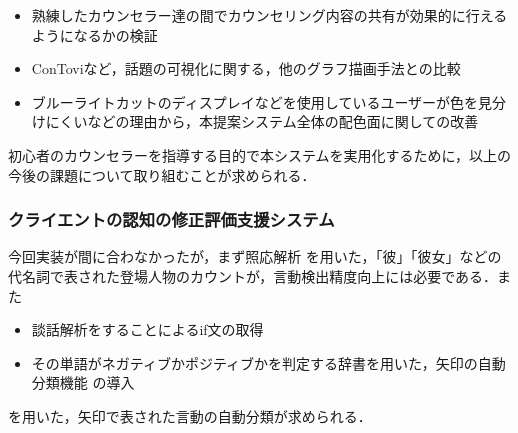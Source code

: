 \documentclass[shuuron]{kuee}
\begin{document}
\begin{itemize}
  \item 熟練したカウンセラー達の間でカウンセリング内容の共有が効果的に行えるようになるかの検証
  \item ConTovi\cite{el2016contovi}など，話題の可視化に関する，他のグラフ描画手法との比較
  \item ブルーライトカットのディスプレイなどを使用しているユーザーが色を見分けにくいなどの理由から，本提案システム全体の配色面に関しての改善
\end{itemize}

初心者のカウンセラーを指導する目的で本システムを実用化するために，以上の今後の課題について取り組むことが求められる．%

\subsubsection{クライエントの認知の修正評価支援システム}

今回実装が間に合わなかったが，まず照応解析\cite{sasano2009probabilistic} \cite{sasano2011discriminative}を用いた，「彼」「彼女」などの代名詞で表された登場人物のカウントが，言動検出精度向上には必要である．また
\begin{itemize}
  \item 談話解析をすることによるif文の取得\cite{kishimoto}
  \item その単語がネガティブかポジティブかを判定する辞書を用いた，矢印の自動分類機能\cite{小林のぞみ2005意見抽出のための評価表現の収集} \cite{東山昌彦2008述語の選択選好性に着目した名詞評価極性の獲得} の導入
\end{itemize}
を用いた，矢印で表された言動の自動分類が求められる．
\end{document}

